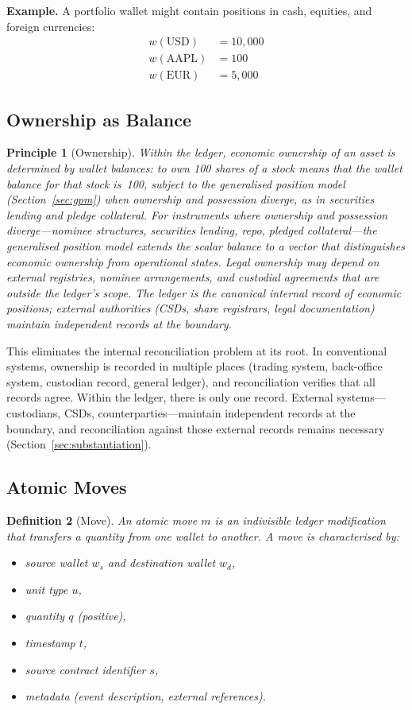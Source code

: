 \documentclass[11pt,a4paper]{article}
\newtheorem{definition}{Definition}[section]
\newtheorem{principle}[definition]{Principle}
\begin{document}
\noindent\textbf{Example.} A portfolio wallet might contain positions in cash, equities, and foreign currencies:
\begin{align*}
w(\text{USD}) &= 10{,}000 \\
w(\text{AAPL}) &= 100 \\
w(\text{EUR}) &= 5{,}000
\end{align*}

\subsection{Ownership as Balance}

\begin{principle}[Ownership]
Within the ledger, economic ownership of an asset is determined by wallet balances: to own 100 shares of a stock means that the wallet balance for that stock is~100, subject to the generalised position model (Section~\ref{sec:gpm}) when ownership and possession diverge, as in securities lending and pledge collateral. For instruments where ownership and possession diverge---nominee structures, securities lending, repo, pledged collateral---the generalised position model extends the scalar balance to a vector that distinguishes economic ownership from operational states. Legal ownership may depend on external registries, nominee arrangements, and custodial agreements that are outside the ledger's scope. The ledger is the canonical internal record of economic positions; external authorities (CSDs, share registrars, legal documentation) maintain independent records at the boundary.
\end{principle}

\noindent This eliminates the internal reconciliation problem at its root. In conventional systems, ownership is recorded in multiple places (trading system, back-office system, custodian record, general ledger), and reconciliation verifies that all records agree. Within the ledger, there is only one record. External systems---custodians, CSDs, counterparties---maintain independent records at the boundary, and reconciliation against those external records remains necessary (Section~\ref{sec:substantiation}).

\subsection{Atomic Moves}

\begin{definition}[Move]
An atomic move $m$ is an indivisible ledger modification that transfers a quantity from one wallet to another. A move is characterised by:
\begin{itemize}[nosep]
\item source wallet $w_s$ and destination wallet $w_d$,
\item unit type $u$,
\item quantity $q$ (positive),
\item timestamp $t$,
\item source contract identifier $s$,
\item metadata (event description, external references).
\end{itemize}
\end{definition}
\end{document}
